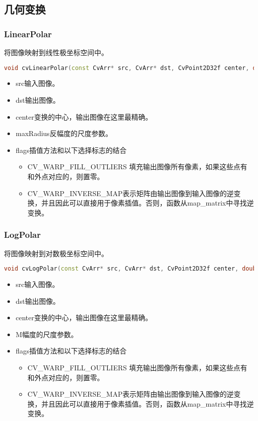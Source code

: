\documentclass[12pt]{article}
\begin{document}
\subsection{几何变换}

\subsubsection{LinearPolar}
将图像映射到线性极坐标空间中。
\begin{lstlisting}[language=c++]
void cvLinearPolar(const CvArr* src, CvArr* dst, CvPoint2D32f center, double maxRadius, int flags=CV_INTER_LINEAR+CV_WARP_FILL_OUTLIERS )
\end{lstlisting}
\begin{itemize}
\item src输入图像。 
\item dst输出图像。 
\item center变换的中心，输出图像在这里最精确。 
\item maxRadius反幅度的尺度参数。 
\item flags插值方法和以下选择标志的结合
	\begin{itemize}
	\item CV\_WARP\_FILL\_OUTLIERS 填充输出图像所有像素，如果这些点有和外点对应的，则置零。
	\item CV\_WARP\_INVERSE\_MAP表示矩阵由输出图像到输入图像的逆变换，并且因此可以直接用于像素插值。否则，函数从map\_matrix中寻找逆变换。 
	\end{itemize} 
\end{itemize}

\subsubsection{LogPolar}
将图像映射到对数极坐标空间中。
\begin{lstlisting}[language=c++]
void cvLogPolar(const CvArr* src, CvArr* dst, CvPoint2D32f center, double M, int flags=CV_INTER_LINEAR+CV_WARP_FILL_OUTLIERS )
\end{lstlisting}
\begin{itemize}
\item src输入图像。 
\item dst输出图像。 
\item center变换的中心，输出图像在这里最精确。 
\item M幅度的尺度参数。 
\item flags插值方法和以下选择标志的结合
	\begin{itemize}
	\item CV\_WARP\_FILL\_OUTLIERS 填充输出图像所有像素，如果这些点有和外点对应的，则置零。
	\item CV\_WARP\_INVERSE\_MAP表示矩阵由输出图像到输入图像的逆变换，并且因此可以直接用于像素插值。否则，函数从map\_matrix中寻找逆变换。 
	\end{itemize} 
\end{itemize}
\end{document}
